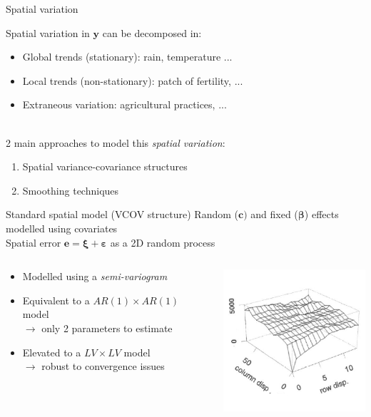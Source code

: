 \documentclass[]{beamer}
\begin{document}
\begin{frame}{Spatial variation}

Spatial variation in $\mathbf{y}$ can be decomposed in:
\begin{itemize}
    \item Global trends (stationary): rain, temperature ... %
    \item Local trends (non-stationary): patch of fertility, ... %
    \item Extraneous variation: agricultural practices, ... %
\end{itemize}
~\\
2 main approaches to model this \emph{spatial variation}:
\begin{enumerate}
    \item Spatial variance-covariance structures
    \item Smoothing techniques
\end{enumerate}
\end{frame}

\begin{frame}{Standard spatial model (VCOV structure)}
Random ($\mathbf{c})$ and fixed ($\boldsymbol{\beta}$) effects modelled using covariates\\
Spatial error $\mathbf{e} = \boldsymbol{\xi} + \boldsymbol{\varepsilon}$ as a 2D random process
\begin{columns}
\begin{column}{0.5\textwidth}
\begin{itemize}
    \item Modelled using a \emph{semi-variogram}
    \item Equivalent to a $AR(1) \times AR(1)$ model
    ~\\ $\rightarrow$ only 2 parameters to estimate
    \item Elevated to a $LV \times LV$ model
    ~\\ $\rightarrow$ robust to convergence issues
\end{itemize}

\end{column}
\begin{column}{0.5\textwidth}
\centering
\includegraphics[width = 5.5cm]{Pictures/vario.PNG}
\end{column}
\end{columns}
\end{frame}
\end{document}
